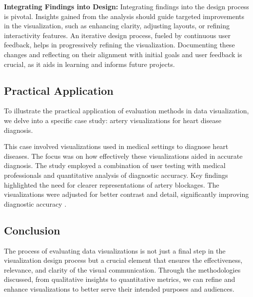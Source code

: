 \textbf{Integrating Findings into Design:}
Integrating findings into the design process is pivotal. Insights gained from the analysis should guide targeted improvements in the visualization, such as enhancing clarity, adjusting layouts, or refining interactivity features. An iterative design process, fueled by continuous user feedback, helps in progressively refining the visualization. Documenting these changes and reflecting on their alignment with initial goals and user feedback is crucial, as it aids in learning and informs future projects.

\subsection{Practical Application}
To illustrate the practical application of evaluation methods in data visualization, we delve into a specific case study: artery visualizations for heart disease diagnosis.

This case involved visualizations used in medical settings to diagnose heart diseases. The focus was on how effectively these visualizations aided in accurate diagnosis. The study employed a combination of user testing with medical professionals and quantitative analysis of diagnostic accuracy. Key findings highlighted the need for clearer representations of artery blockages. The visualizations were adjusted for better contrast and detail, significantly improving diagnostic accuracy \cite{borkinEvaluationArteryVisualizations2011}.

\subsection{Conclusion}
The process of evaluating data visualizations is not just a final step in the visualization design process but a crucial element that ensures the effectiveness, relevance, and clarity of the visual communication. Through the methodologies discussed, from qualitative insights to quantitative metrics, we can refine and enhance visualizations to better serve their intended purposes and audiences.